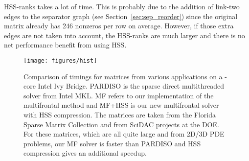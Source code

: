 \documentclass{article}
\newcommand{\tm}{\textsuperscript{\textregistered}}
\begin{document}
HSS-ranks takes a lot of time. This is probably due to the addition of
link-two edges to the separator graph (see
Section~\ref{sec:sep_reorder}) since the original matrix already has
246 nonzeros per row on average. However, if those extra edges are not
taken into account, the HSS-ranks are much larger and there is no net
performance benefit from using HSS.
\begin{figure}
  \begin{center}
    \texttt{[image: figures/hist]}
  \end{center}    
  \caption{\footnotesize Comparison of timings for matrices from various
    applications on a -core Intel\tm{} Ivy Bridge. PARDISO is the
    sparse direct multithreaded solver from Intel\tm{} MKL. MF refers
    to our implementation of the multifrontal method and MF+HSS is our
    new multifrontal solver with HSS compression. The matrices are
    taken from the Florida Sparse Matrix Collection and from SciDAC
    projects at the DOE. For these matrices, which are all quite large
    and from 2D/3D PDE problems, our MF solver is faster than PARDISO
    and HSS compression gives an additional speedup.}
  \label{fig:hist}
\end{figure}
\end{document}

